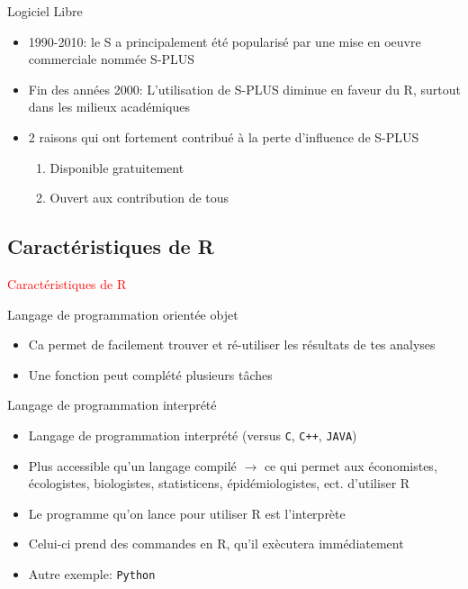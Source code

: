 \documentclass[11pt]{beamer}\usepackage[]{graphicx}\usepackage[]{color}
\newcommand{\code}[1]{\texttt{#1}}
\begin{document}
\begin{frame}{Logiciel Libre}
\begin{itemize}
  \setlength\itemsep{2em}
\item 1990-2010: le S a principalement \'{e}t\'{e} popularis\'{e} par une mise en oeuvre commerciale nomm\'{e}e S-PLUS
\pause \item Fin des ann\'{e}es 2000: L'utilisation de S-PLUS diminue en faveur du R, surtout dans les milieux acad\'{e}miques
\pause \item 2 raisons qui ont fortement contribu\'{e} \`{a} la perte d'influence de S-PLUS
\begin{enumerate}
\item \normalsize Disponible gratuitement
\pause \item Ouvert aux contribution de tous
\end{enumerate}
\end{itemize}
\end{frame}



\subsection{Caract\'{e}ristiques de R}

\begin{frame}
 \begin{center}
  \Huge{\textcolor{red}{Caract\'{e}ristiques de R}}
 \end{center}
\end{frame}



\begin{frame}{Langage de programmation orientée objet}
\begin{itemize}
  \setlength\itemsep{2em}
\item Ca permet de facilement trouver et ré-utiliser les résultats de tes analyses
\pause \item Une fonction peut complété plusieurs t\^{a}ches
\end{itemize}
\end{frame}


\begin{frame}{Langage de programmation interpr\'{e}t\'{e}}
\begin{itemize}
  \setlength\itemsep{2em}
\item Langage de programmation interpr\'{e}t\'{e} (versus \code{C}, \code{C++}, \code{JAVA})
\item Plus accessible qu'un langage compilé $\rightarrow$ ce qui permet aux économistes, écologistes, biologistes, statisticens, épidémiologistes, ect. d'utiliser R  
\pause \item Le programme qu'on lance pour utiliser R est l'interpr\`{e}te
\pause \item Celui-ci prend des commandes en R, qu'il ex\`{e}cutera imm\'{e}diatement
\pause \item  Autre exemple: \code{Python}
\end{itemize}
\end{frame}
\end{document}
